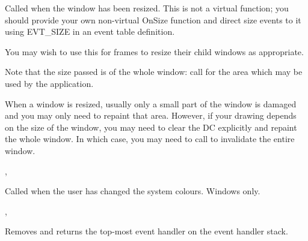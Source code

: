 Called when the window has been resized. This is not a virtual function; you should
provide your own non-virtual OnSize function and direct size events to it using EVT\_SIZE
in an event table definition.




You may wish to use this for frames to resize their child windows as appropriate.

Note that the size passed is of
the whole window: call  for the area which may be
used by the application.

When a window is resized, usually only a small part of the window is damaged and you
may only need to repaint that area. However, if your drawing depends on the size of the window,
you may need to clear the DC explicitly and repaint the whole window. In which case, you
may need to call  to invalidate the entire window.


,\rtfsp
{}

\label{wxwindowonsyscolourchanged}


Called when the user has changed the system colours. Windows only.




,\rtfsp
{}

\label{wxwindowpopeventhandler}


Removes and returns the top-most event handler on the event handler stack.


